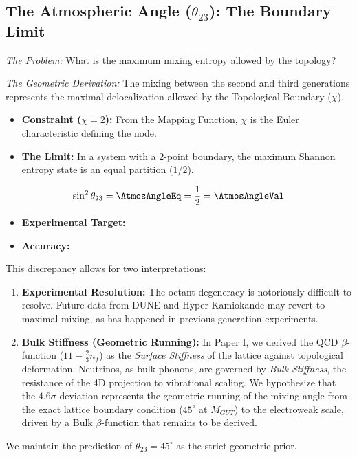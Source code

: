 \subsection{The Atmospheric Angle (\texorpdfstring{$\theta_{23}$}{theta23}): The Boundary Limit}

\textit{The Problem:} What is the maximum mixing entropy allowed by the topology?

\textit{The Geometric Derivation:} The mixing between the second and third generations represents the maximal delocalization allowed by the Topological Boundary ($\chi$).

\begin{itemize}
    \item \textbf{Constraint ($\chi = 2$):} From the Mapping Function, $\chi$ is the Euler characteristic defining the node.
    \item \textbf{The Limit:} In a system with a 2-point boundary, the maximum Shannon entropy state is an equal partition ($1/2$).
\end{itemize}

\begin{equation}
\sin^2 \theta_{23} = \AtmosAngleEq = \frac{1}{2} = \mathbf{\AtmosAngleVal}
\end{equation}

\begin{itemize}
    \item \textbf{Experimental Target:} \AtmosAngleExperimentalValue
    \item \textbf{Accuracy:} \AtmosAngleAccText
\end{itemize}

This discrepancy allows for two interpretations:
\begin{enumerate}
    \item \textbf{Experimental Resolution:} The octant degeneracy is notoriously difficult to resolve. Future data from DUNE and Hyper-Kamiokande may revert to maximal mixing, as has happened in previous generation experiments.
    \item \textbf{Bulk Stiffness (Geometric Running):} In Paper I, we derived the QCD $\beta$-function ($11 - \frac{2}{3}n_f$) as the \textit{Surface Stiffness} of the lattice against topological deformation. Neutrinos, as bulk phonons, are governed by \textit{Bulk Stiffness}, the resistance of the 4D projection to vibrational scaling. We hypothesize that the $4.6\sigma$ deviation represents the geometric running of the mixing angle from the exact lattice boundary condition ($45^\circ$ at $M_{GUT}$) to the electroweak scale, driven by a Bulk $\beta$-function that remains to be derived.
\end{enumerate}
We maintain the prediction of $\theta_{23}=45^\circ$ as the strict geometric prior.

